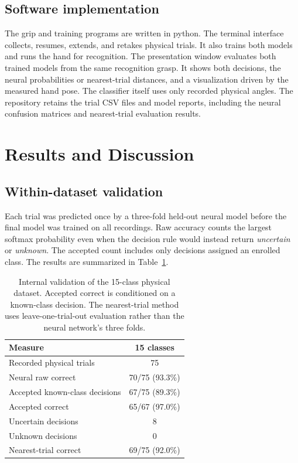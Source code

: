 \documentclass[authoryear,12pt]{elsarticle}
\begin{document}
\subsection{Software implementation}
\label{sec:software}

The grip and training programs are written in python.
 The terminal interface collects,
resumes, extends, and retakes physical trials. It also
trains both models and runs the hand for recognition.
The presentation window evaluates both trained models
from the same recognition grasp. It shows both decisions,
the neural probabilities or nearest-trial distances,
and a visualization driven by the measured hand pose.
The classifier itself uses only recorded physical angles.
The repository retains the trial CSV files and model
reports, including the neural confusion matrices and
nearest-trial evaluation results.

\section{Results and Discussion}
\label{sec:results}

\subsection{Within-dataset validation}
\label{sec:evaluation}

Each trial was predicted once by a three-fold held-out
neural model before the final model was trained on all
recordings. Raw accuracy counts the largest softmax
probability even when the decision rule would instead
return \emph{uncertain} or \emph{unknown}. The accepted
count includes only decisions assigned an enrolled class.
The results are summarized in Table~\ref{tab:results}.

\begin{table}[h]
\centering
\caption{Internal validation of the 15-class physical dataset.
Accepted correct is conditioned on a known-class decision.
The nearest-trial method uses leave-one-trial-out evaluation
rather than the neural network's three folds. \\}
\label{tab:results}
\small
\begin{tabular}{|l|c|}
\hline
Measure & 15 classes \\
\hline
Recorded physical trials & 75 \\
Neural raw correct & 70/75 (93.3\%) \\
Accepted known-class decisions & 67/75 (89.3\%) \\
Accepted correct & 65/67 (97.0\%) \\
Uncertain decisions & 8 \\
Unknown decisions & 0 \\
Nearest-trial correct & 69/75 (92.0\%) \\
\hline
\end{tabular}
\end{table}
\end{document}
